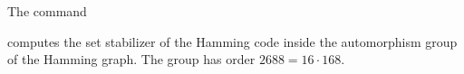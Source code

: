 The command




computes the set stabilizer of the Hamming code inside the automorphism group of the Hamming graph. 
The group has order $2688 = 16 \cdot 168$.

\bigskip
